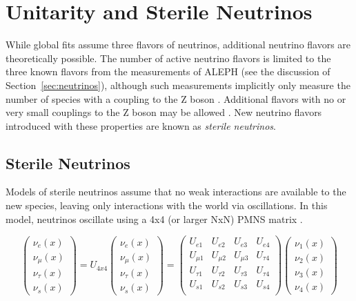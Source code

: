 \section{Unitarity and Sterile Neutrinos}
While global fits assume three flavors of neutrinos, additional neutrino flavors are theoretically possible.
The number of active neutrino flavors is limited to the three known flavors from the measurements of ALEPH (see the discussion of Section~\ref{sec:neutrinos}), although such measurements implicitly only measure the number of species with a coupling to the Z boson \cite{ALEPH-3Nu}.
Additional flavors with no or very small couplings to the Z boson may be allowed \cite{Review-LightSterile}.
New neutrino flavors introduced with these properties are known as \emph{sterile neutrinos}.

\label{subsec:steriles}
\subsection{Sterile Neutrinos}
Models of sterile neutrinos assume that no weak interactions are available to the new species, leaving only interactions with the world via oscillations.
In this model, neutrinos oscillate using a 4x4 (or larger NxN) PMNS matrix \cite{Review-PMNS, GlobalSteriles-2012, GlobalSteriles-2017, Review-LightSterile}.

\begin{equation}
\begin{pmatrix} \nu_e\left(x\right) \\ 	\nu_\mu\left(x\right) \\	\nu_\tau\left(x\right) \\  \nu_s\left(x\right)\end{pmatrix} = 
U_{4x4} \begin{pmatrix} \nu_e\left(x\right) \\ 	\nu_\mu\left(x\right) \\	\nu_\tau\left(x\right) \\	\nu_s\left(x\right)\end{pmatrix} = 
\begin{pmatrix}
 U_{e 1} & U_{e 2} & U_{e 3} & U_{e 4} \\
 U_{\mu 1} & U_{\mu 2} & U_{\mu 3} & U_{\tau 4}  \\
 U_{\tau 1} & U_{\tau 2} & U_{\tau 3} & U_{\tau 4}  \\
 U_{s 1} & U_{s 2} & U_{s 3} & U_{s 4}  \\
\end{pmatrix} 	
\begin{pmatrix} \nu_1\left(x\right) \\ 	\nu_2\left(x\right) \\	\nu_3\left(x\right) \\ \nu_4\left(x\right) \end{pmatrix}
\label{eqn:4flavor_pmns}
\end{equation}

